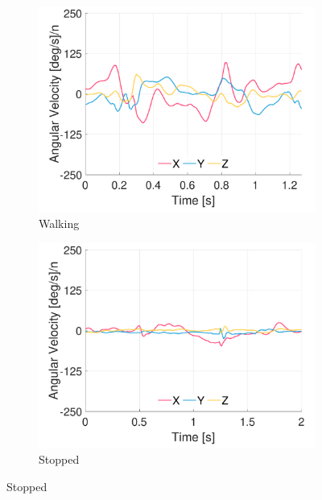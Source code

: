 \begin{figure}[p]
\centering
    \begin{subfigure}[b]{0.49\textwidth}
         \centering
         \includegraphics[width=\textwidth]{content/3-Methods/example-data/ch3_example_data_subject_01_l_hip_gyro_activity_walking.pdf}
         \caption{Walking}
    \end{subfigure}
    \begin{subfigure}[b]{0.49\textwidth}
         \centering
         \includegraphics[width=\textwidth]{content/3-Methods/example-data/ch3_example_data_subject_01_l_hip_gyro_activity_stop.pdf}
         \caption{Stopped}
    \end{subfigure}
    

\end{figure}
